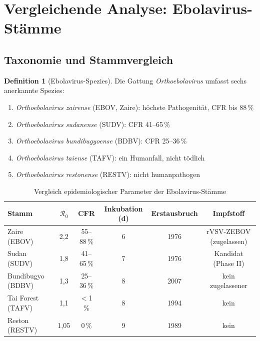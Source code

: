 ﻿\documentclass[12pt,a4paper]{article}
\theoremstyle{definition}
\newtheorem{definition}{Definition}[section]
\theoremstyle{plain}
\theoremstyle{remark}
\begin{document}
\section{Vergleichende Analyse: Ebolavirus-Stämme}

\subsection{Taxonomie und Stammvergleich}

\begin{definition}[Ebolavirus-Spezies]
Die Gattung \textit{Orthoebolavirus} umfasst sechs anerkannte Spezies:
\begin{enumerate}
  \item \textit{Orthoebolavirus zairense} (EBOV, Zaire): höchste Pathogenität, CFR bis 88\,\%
  \item \textit{Orthoebolavirus sudanense} (SUDV): CFR 41--65\,\%
  \item \textit{Orthoebolavirus bundibugyoense} (BDBV): CFR 25--36\,\%
  \item \textit{Orthoebolavirus taiense} (TAFV): ein Humanfall, nicht tödlich
  \item \textit{Orthoebolavirus restonense} (RESTV): nicht humanpathogen
\end{enumerate}
\end{definition}

\begin{table}[H]
\centering
\caption{Vergleich epidemiologischer Parameter der Ebolavirus-Stämme}
\label{tab:strains}
\begin{tabular}{lccccc}
\toprule
Stamm & $\mathcal{R}_0$ & CFR & Inkubation (d) & Erstausbruch & Impfstoff \\
\midrule
Zaire (EBOV)      & 2,2  & 55--88\,\% & 6 & 1976 & rVSV-ZEBOV (zugelassen) \\
Sudan (SUDV)      & 1,8  & 41--65\,\% & 7 & 1976 & Kandidat (Phase II)     \\
Bundibugyo (BDBV) & 1,3  & 25--36\,\% & 8 & 2007 & kein zugelassener       \\
Tai Forest (TAFV) & 1,1  & $<$1\,\%   & 8 & 1994 & kein                    \\
Reston (RESTV)    & 1,05 & 0\,\%      & 9 & 1989 & kein                    \\
\bottomrule
\end{tabular}
\end{table}
\end{document}
